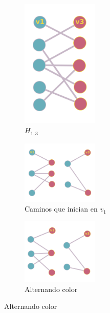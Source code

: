 \documentclass[a4paper,1pt]{report}
\begin{document}
\begin{figure}[H]
    \centering
    \begin{subfigure}[b]{0.30\textwidth}
        \centering 
        \includegraphics[width=0.4\textwidth]{figures6/recol1.png}
        \caption{$H_{1,3}$}
    \end{subfigure} 
    \begin{subfigure}[b]{0.50\textwidth}
        \centering 
        \includegraphics[width=0.4\textwidth]{figures6/recol2.png}
        \caption{Caminos que inician en $v_1$}
    \end{subfigure}
    \begin{subfigure}[b]{0.50\textwidth}
        \centering 
        \includegraphics[width=0.4\textwidth]{figures6/recol3.png}
        \caption{Alternando color}
    \end{subfigure}

\end{figure}
\end{document}
